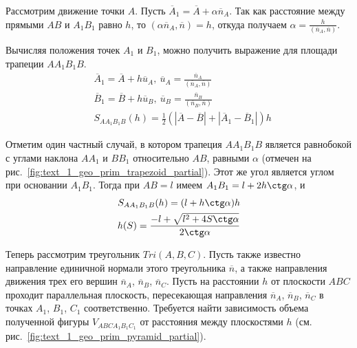 Рассмотрим движение точки $A$.
Пусть $\overline{A}_1 = \overline{A} + \alpha \overline{n}_A$.
Так как расстояние между прямыми $AB$ и $A_1B_1$ равно $h$, то $(\alpha \overline{n}_A, \overline{n}) = h$, откуда получаем $\alpha = \frac{h}{(\overline{n}_A, \overline{n})}$.

Вычисляя положения точек $A_1$ и $B_1$, можно получить выражение для площади трапеции $AA_1B_1B$.
\begin{equation}\label{eqn:text_1_geo_prim_aa1b1b}
	\begin{aligned}
		& \overline{A}_1 = \overline{A} + h \overline{u}_A, \ \overline{u}_A = \frac{\overline{n}_A}{(\overline{n}_A, \overline{n})} \\
		& \overline{B}_1 = \overline{B} + h \overline{u}_B, \ \overline{u}_B = \frac{\overline{n}_B}{(\overline{n}_B, \overline{n})} \\
		& S_{AA_1B_1B}(h) = \frac{1}{2} \left( |\overline{A} - \overline{B}| + |\overline{A}_1 - \overline{B}_1| \right) h
	\end{aligned}
\end{equation}

Отметим один частный случай, в котором трапеция $AA_1B_1B$ является равнобокой с углами наклона $AA_1$ и $BB_1$ относительно $AB$, равными $\alpha$ (отмечен на рис.~\ref{fig:text_1_geo_prim_trapezoid_partial}).
Этот же угол является углом при основании $A_1B_1$.
Тогда при $AB = l$ имеем $A_1B_1 = l + 2 h \ctg \alpha$, и
\begin{equation}
	\begin{aligned}
		S_{AA_1B_1B}(h) = (l + h \ctg \alpha) h \\
		h(S) = \frac{-l + \sqrt{l^2 + 4 S \ctg \alpha}}{2 \ctg \alpha}
	\end{aligned}
\end{equation}

Теперь рассмотрим треугольник $Tri(A, B, C)$.
Пусть также известно направление единичной нормали этого треугольника $\overline{n}$, а также направления движения трех его вершин $\overline{n}_A$, $\overline{n}_B$, $\overline{n}_C$.
Пусть на расстоянии $h$ от плоскости $ABC$ проходит параллельная плоскость, пересекающая направления $\overline{n}_A$, $\overline{n}_B$, $\overline{n}_C$ в точках $A_1$, $B_1$, $C_1$ соответственно.
Требуется найти зависимость объема полученной фигуры $V_{ABCA_1B_1C_1}$ от расстояния между плоскостями $h$ (см. рис.~\ref{fig:text_1_geo_prim_pyramid_partial}).

